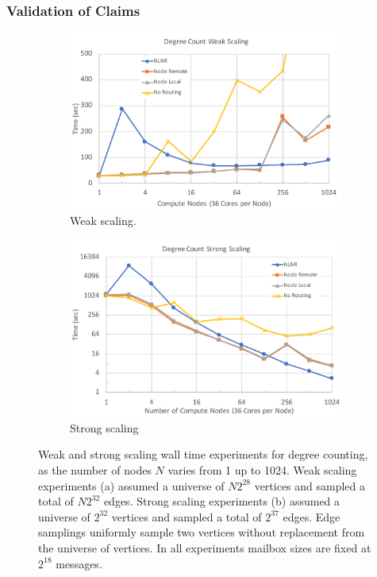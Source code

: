 \documentclass{beamer}
\begin{document}

\begin{frame}
\frametitle{Validation of Claims}


\begin{figure}
	\begin{center}
		\begin{subfigure}{0.49\linewidth}
			\centerline{\includegraphics[width=1.0\columnwidth]{degree_weak_scaling}}
			\caption{Weak scaling. \label{fig:degree_weak_scaling}}
		\end{subfigure}
		\begin{subfigure}{0.49\linewidth}
			\centerline{\includegraphics[width=1.0\columnwidth]{degree_strong_scaling}}
			\caption{Strong scaling \label{fig:degree_strong_scaling}}
		\end{subfigure}
		\caption{Weak and strong scaling wall time experiments for degree counting, as the number of nodes $N$ varies from 1 up to 1024.
			Weak scaling experiments (a) assumed a universe of $N2^{28}$ vertices and sampled a total of $N2^{32}$ edges.
			Strong scaling experiments (b) assumed a universe of $2^{32}$ vertices and sampled a total of $2^{37}$ edges. 
			Edge samplings uniformly sample two vertices without replacement from the universe of vertices.
			In all experiments mailbox sizes are fixed at $2^{18}$ messages.
			\label{fig:degree_scaling}}
	\end{center}
\end{figure}



\end{frame}
\end{document}
